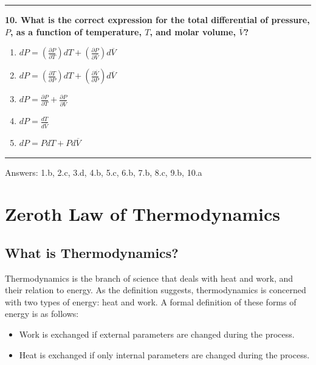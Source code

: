 \documentclass[
  9pt,
]{extbook}
\providecommand{\tightlist}{%
  \setlength{\itemsep}{0pt}\setlength{\parskip}{0pt}}
\theoremstyle{definition}
\theoremstyle{definition}
\theoremstyle{definition}
\theoremstyle{definition}
\theoremstyle{remark}
\begin{document}
\begin{center}\rule{0.5\linewidth}{0.5pt}\end{center}

\textbf{10. What is the correct expression for the total differential of pressure, \(P\), as a function of temperature, \(T\), and molar volume, \(\overline{V}\)?}

\begin{enumerate}
\def\labelenumi{\alph{enumi}.}
\tightlist
\item
  \(dP = \left(\frac{\partial P}{\partial T}\right)dT + \left(\frac{\partial P}{\partial \overline{V}}\right)d\overline{V}\)
\item
  \(dP = \left(\frac{\partial T}{\partial P}\right)dT + \left(\frac{\partial \overline{V}}{\partial P}\right)d\overline{V}\)
\item
  \(dP = \frac{\partial P}{\partial T} + \frac{\partial P}{\partial \overline{V}}\)
\item
  \(dP = \frac{dT}{d\overline{V}}\)
\item
  \(dP = PdT + Pd\overline{V}\)
\end{enumerate}

\begin{center}\rule{0.5\linewidth}{0.5pt}\end{center}

Answers: 1.b, 2.c, 3.d, 4.b, 5.c, 6.b, 7.b, 8.c, 9.b, 10.a

\chapter{Zeroth Law of Thermodynamics}\label{ZerothLaw}

\section{What is Thermodynamics?}\label{what-is-thermodynamics}

Thermodynamics is the branch of science that deals with heat and work, and their relation to energy. As the definition suggests, thermodynamics is concerned with two types of energy: heat and work. A formal definition of these forms of energy is as follows:

\begin{itemize}
\tightlist
\item
  Work is exchanged if external parameters are changed during the process.
\item
  Heat is exchanged if only internal parameters are changed during the process.
\end{itemize}
\end{document}
